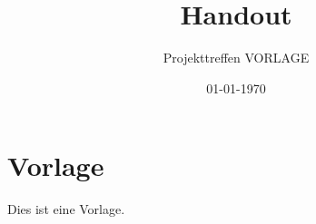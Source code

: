 \documentclass[a4paper,DIV=9,12pt]{scrreprt}
\begin{document}


\onehalfspace

\begin{titlepage}
    \title{Handout}
    \subtitle{Projekttreffen VORLAGE}
    \author{}
    \date{01-01-1970}
    \maketitle
    \thispagestyle{empty}
\end{titlepage}
\setcounter{page}{1}


\chapter{Vorlage}

Dies ist eine Vorlage.
\end{document}

